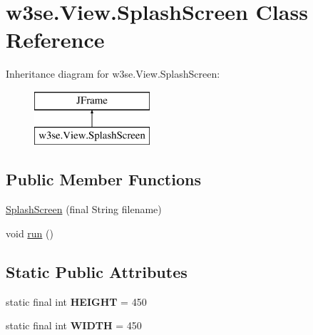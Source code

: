 \hypertarget{classw3se_1_1_view_1_1_splash_screen}{\section{w3se.\-View.\-Splash\-Screen Class Reference}
\label{classw3se_1_1_view_1_1_splash_screen}
}
Inheritance diagram for w3se.\-View.\-Splash\-Screen\-:\begin{figure}[H]
\begin{center}
\leavevmode
\includegraphics[height=2.000000cm]{classw3se_1_1_view_1_1_splash_screen}
\end{center}
\end{figure}
\subsection*{Public Member Functions}
\begin{DoxyCompactItemize}
\item 
\hyperlink{classw3se_1_1_view_1_1_splash_screen_a322a3385deab9ae2feb4ad450557b13b}{Splash\-Screen} (final String filename)
\item 
void \hyperlink{classw3se_1_1_view_1_1_splash_screen_aa3ca8ac2ae774ac08b24db67b761ae4f}{run} ()
\end{DoxyCompactItemize}
\subsection*{Static Public Attributes}
\begin{DoxyCompactItemize}
\item 
\hypertarget{classw3se_1_1_view_1_1_splash_screen_acba10e25269498505645179695d7fcc0}{static final int {\bfseries H\-E\-I\-G\-H\-T} = 450}\label{classw3se_1_1_view_1_1_splash_screen_acba10e25269498505645179695d7fcc0}

\item 
\hypertarget{classw3se_1_1_view_1_1_splash_screen_a6690abc44d77c14834d24c2f48ef2bd1}{static final int {\bfseries W\-I\-D\-T\-H} = 450}\label{classw3se_1_1_view_1_1_splash_screen_a6690abc44d77c14834d24c2f48ef2bd1}

\end{DoxyCompactItemize}


